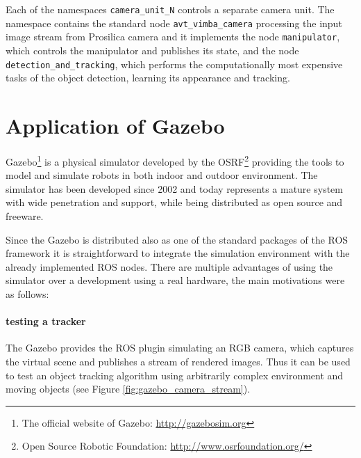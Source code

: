 	Each of the namespaces \texttt{camera\_unit\_N} controls a separate camera unit. The namespace contains the standard node \texttt{avt\_vimba\_camera} processing the input image stream from Prosilica camera and it implements the node \texttt{manipulator}, which controls the manipulator and publishes its state, and the node \texttt{detection\_and\_tracking}, which performs the computationally most expensive tasks of the object detection, learning its appearance and tracking.
	
	
	\section{Application of Gazebo} \label{txt:application_of_gazebo}
	
	Gazebo\footnote{The official website of Gazebo: \url{http://gazebosim.org}} is a physical simulator developed by the OSRF\footnote{Open Source Robotic Foundation: \url{http://www.osrfoundation.org/}} providing the tools to model and simulate robots in both indoor and outdoor environment. The simulator has been developed since 2002 and today represents a mature system with wide penetration and support, while being distributed as open source and freeware. 
	
	Since the Gazebo is distributed also as one of the standard packages of the ROS framework it is straightforward to integrate the simulation environment with the already implemented ROS nodes. There are multiple advantages of using the simulator over a development using a real hardware, the main motivations were as follows:
	
	\paragraph{testing a tracker} The Gazebo provides the ROS plugin simulating an RGB camera, which captures the virtual scene and publishes a stream of rendered images. Thus it can be used to test an object tracking algorithm using arbitrarily complex environment and moving objects (see Figure \ref{fig:gazebo_camera_stream}).
	
